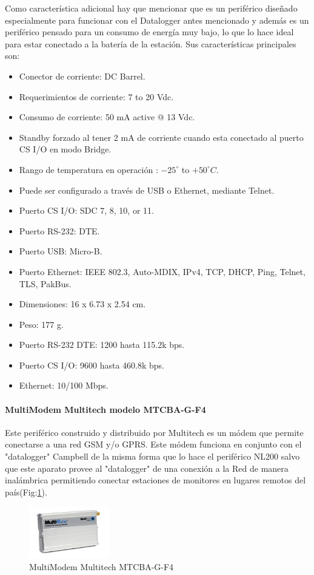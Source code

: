 Como característica adicional hay que mencionar que es un periférico diseñado especialmente para funcionar con el Datalogger antes mencionado y además es un periférico pensado para un consumo de energía muy bajo, lo que lo hace ideal para estar conectado a la batería de la estación. Sus características principales son:

\begin{itemize}
\item Conector de corriente: DC Barrel.
\item Requerimientos de corriente: 7 to 20 Vdc. 
\item Consumo de corriente: 50 mA active @ 13 Vdc.
\item Standby forzado al tener 2 mA de corriente cuando esta conectado al puerto CS I/O en modo Bridge.
\item Rango de temperatura en operación : ${-25}^{\circ}$ to ${+50}^{\circ}C$.
\item Puede ser configurado a través de USB o Ethernet, mediante Telnet.
\item Puerto CS I/O: SDC 7, 8, 10, or 11.
\item Puerto RS-232: DTE.
\item Puerto USB: Micro-B.
\item Puerto Ethernet: IEEE 802.3, Auto-MDIX, IPv4, TCP, DHCP, Ping, Telnet, TLS, PakBus.
\item Dimensiones: 16 x 6.73 x 2.54 cm.
\item Peso: 177 g.
\item Puerto RS-232 DTE: 1200 hasta 115.2k bps.
\item Puerto CS I/O: 9600 hasta 460.8k bps.
\item Ethernet: 10/100 Mbps.
\end{itemize}

\paragraph{MultiModem Multitech modelo MTCBA-G-F4}
Este periférico construido y distribuido por Multitech es un módem que permite conectarse a una red GSM y/o GPRS. Este módem funciona en conjunto con el "datalogger" Campbell de la misma forma que lo hace el periférico NL200 salvo que este aparato provee al "datalogger" de una conexión a la Red de manera inalámbrica permitiendo conectar estaciones de monitores en lugares remotos del país(Fig:\ref{modem}).\\

\begin{figure}[h!]
        \centering
        \includegraphics[width=100pt]{images/MultiModemGPRS}
        \caption{MultiModem Multitech MTCBA-G-F4}
	\label{modem} 
\end{figure}

